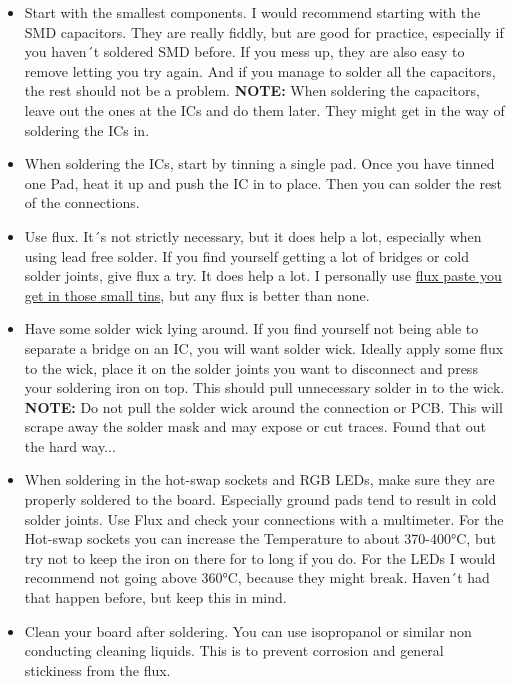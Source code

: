 \documentclass[english, 12pt]{scrartcl}
\begin{document}
	\begin{itemize}
		\item Start with the smallest components. I would recommend starting with the SMD capacitors. They are really fiddly, but are good for practice, especially if you haven´t soldered SMD before. If you mess up, they are also easy to remove letting you try again. And if you manage to solder all the capacitors, the rest should not be a problem.\newline
		\textbf{NOTE:} When soldering the capacitors, leave out the ones at the ICs and do them later. They might get in the way of soldering the ICs in.
		\item When soldering the ICs, start by tinning a single pad. Once you have tinned one Pad, heat it up and push the IC in to place. Then you can solder the rest of the connections.
		\item Use flux. It´s not strictly necessary, but it does help a lot, especially when using lead free solder. If you find yourself getting a lot of bridges or cold solder joints, give flux a try. It does help a lot. I personally use \href{https://www.amazon.de/FELDER-L%C3%B6tfett-L%C3%B6tmittel-Solder-L%C3%B6tpaste/dp/B01822CUO6}{flux paste you get in those small tins}, but any flux is better than none.
		\item Have some solder wick lying around. If you find yourself not being able to separate a bridge on an IC, you will want solder wick. Ideally apply some flux to the wick, place it on the solder joints you want to disconnect and press your soldering iron on top. This should pull unnecessary solder in to the wick.\newline
		\textbf{NOTE:} Do not pull the solder wick around the connection or PCB. This will scrape away the solder mask and may expose or cut traces. Found that out the hard way...
		\item When soldering in the hot-swap sockets and RGB LEDs, make sure they are properly soldered to the board. Especially ground pads tend to result in cold solder joints. Use Flux and check your connections with a multimeter. For the Hot-swap sockets you can increase the Temperature to about 370-400°C, but try not to keep the iron on there for to long if you do. For the LEDs I would recommend not going above 360°C, because they might break. Haven´t had that happen before, but keep this in mind.
		\item Clean your board after soldering. You can use isopropanol or similar non conducting cleaning liquids. This is to prevent corrosion and general stickiness from the flux.
	\end{itemize}
	
\end{document}
